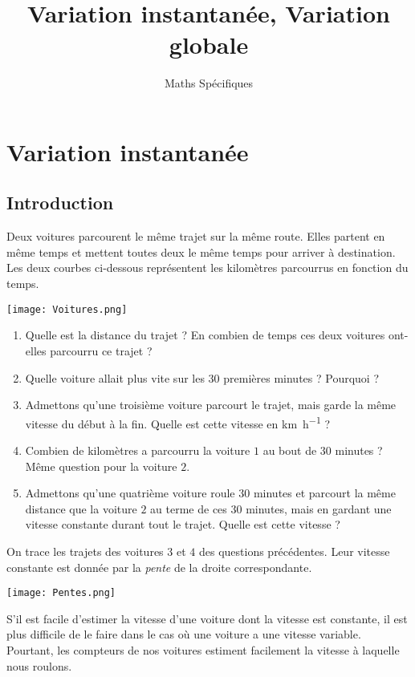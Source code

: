 \documentclass{article}
\title{Variation instantanée, Variation globale}
\date{}
\author{Maths Spécifiques}
\begin{document}
\maketitle

\section{Variation instantanée}
\subsection{Introduction}
Deux voitures parcourent le même trajet sur la même route. Elles partent en même temps et mettent toutes deux le même temps pour arriver à destination. Les deux courbes ci-dessous représentent les kilomètres parcourrus en fonction du temps.

\begin{center}
\texttt{[image: Voitures.png]}
\end{center}

\begin{exercize}
\begin{enumerate}[label=\emph{\alph*)}]
\item Quelle est la distance du trajet ? En combien de temps ces deux voitures ont-elles parcourru ce trajet ?
\item Quelle voiture allait plus vite sur les $30$ premières minutes ? Pourquoi ?
\item Admettons qu'une troisième voiture parcourt le trajet, mais garde la même vitesse du début à la fin. Quelle est cette vitesse en \unit{\kilo\meter\per\hour} ?
\item Combien de kilomètres a parcourru la voiture $1$ au bout de $30$ minutes ? Même question pour la voiture $2$.
\item Admettons qu'une quatrième voiture roule $30$ minutes et parcourt la même distance que la voiture $2$ au terme de ces $30$ minutes, mais en gardant une vitesse constante durant tout le trajet. Quelle est cette vitesse ?
\end{enumerate}
\end{exercize}
\emptybox{6cm}
\newpage
On trace les trajets des voitures $3$ et $4$ des questions précédentes. Leur vitesse constante est donnée par la \emph{pente} de la droite correspondante.
\begin{center}
\texttt{[image: Pentes.png]}
\end{center}
S'il est facile d'estimer la vitesse d'une voiture dont la vitesse est constante, il est plus difficile de le faire dans le cas où une voiture a une vitesse variable. Pourtant, les compteurs de nos voitures estiment facilement la vitesse à laquelle nous roulons.
\end{document}

